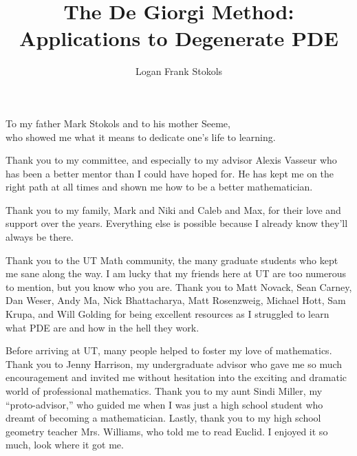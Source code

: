 \documentclass[11pt]{report}	%
\author{Logan Frank Stokols}  	%
\title{The De Giorgi Method: Applications to Degenerate PDE}
\theoremstyle{definition}
\theoremstyle{remark}
\begin{document}
\copyrightpage          %


%
%
%
\commcertpage           %

\titlepage              %



%
\begin{dedication}
%
To my father Mark Stokols and to his mother Seeme, \\who showed me what it means to dedicate one's life to learning.
\end{dedication}


\begin{acknowledgments}		%
%
Thank you to my committee, and especially to my advisor Alexis Vasseur who has been a better mentor than I could have hoped for.  He has kept me on the right path at all times and shown me how to be a better mathematician.   

Thank you to my family, Mark and Niki and Caleb and Max, for their love and support over the years.  Everything else is possible because I already know they'll always be there.  

Thank you to the UT Math community, the many graduate students who kept me sane along the way.  I am lucky that my friends here at UT are too numerous to mention, but you know who you are. Thank you to Matt Novack, Sean Carney, Dan Weser, Andy Ma, Nick Bhattacharya, Matt Rosenzweig, Michael Hott, Sam Krupa, and Will Golding for being excellent resources as I struggled to learn what PDE are and how in the hell they work.  

Before arriving at UT, many people helped to foster my love of mathematics.  Thank you to Jenny Harrison, my undergraduate advisor who gave me so much encouragement and invited me without hesitation into the exciting and dramatic world of professional mathematics.  Thank you to my aunt Sindi Miller, my ``proto-advisor,'' who guided me when I was just a high school student who dreamt of becoming a mathematician.  Lastly, thank you to my high school geometry teacher Mrs. Williams, who told me to read Euclid.  I enjoyed it so much, look where it got me.  
\end{acknowledgments}
\end{document}
